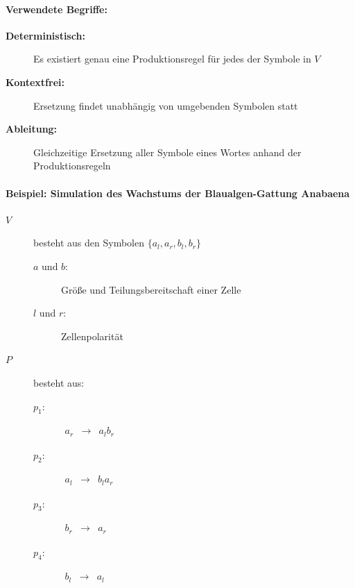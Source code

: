 \newpage

\paragraph{Verwendete Begriffe:\\}

\begin{description}
	\item[\textbf{Deterministisch:}] Es existiert genau eine Produktionsregel für jedes der Symbole in $V$ \\
	
	\item[\textbf{Kontextfrei:}] Ersetzung findet unabhängig von umgebenden Symbolen statt \\
	
	\item[\textbf{Ableitung:}] Gleichzeitige Ersetzung aller Symbole eines Wortes anhand der Produktionsregeln
	
\end{description}





\newpage
{}

\paragraph{Beispiel: Simulation des Wachstums der Blaualgen-Gattung \glqq Anabaena\grqq{} \\}

  
\begin{description}
	\item[\boldmath$V$]  besteht aus den Symbolen \boldmath$\{a_l, a_r, b_l, b_r\}$
	\begin{description}
		\item[\boldmath$a$ und \boldmath$b$:] Größe und Teilungsbereitschaft einer Zelle\\
		\item[\boldmath$l$ und \boldmath$r$:] Zellenpolarität
	\end{description}
	\item[\boldmath$P$] besteht aus:
	\begin{description}
		\item[\boldmath$p_1 :$] $\begin{array}{ccc} a_r & \rightarrow & a_lb_r \end{array}$
		\item[\boldmath$p_2 :$] $\begin{array}{ccc} a_l &\rightarrow& b_la_r \end{array}$
		\item[\boldmath$p_3 :$] $\begin{array}{ccc} b_r &\rightarrow& a_r \end{array}$
		\item[\boldmath$p_4 :$] $\begin{array}{ccc} b_l &\rightarrow& a_l  \end{array}$
	\end{description}
\end{description}





